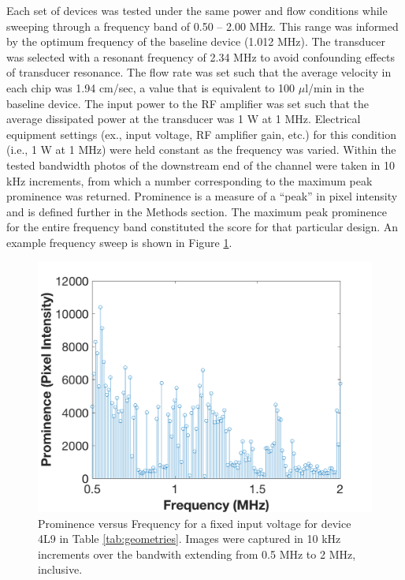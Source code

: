 Each set of devices was tested under the same power and flow conditions while sweeping through a frequency band  of  0.50 -- 2.00 MHz.  This range was informed by the optimum frequency of the baseline device (1.012 MHz).  The transducer was selected with a resonant frequency of 2.34 MHz to avoid confounding effects of transducer resonance. The flow rate was set such that the average velocity in each chip was  1.94 cm/sec, a value that is equivalent to 100 $\mu$l/min in the baseline device. The input power to the RF amplifier was set such that the average dissipated power at the transducer was 1 W at 1 MHz. Electrical equipment settings (ex., input voltage, RF amplifier gain, etc.) for this condition (i.e., 1 W at 1 MHz) were held constant as the frequency was varied. Within the tested bandwidth photos of the downstream end of the channel were taken in 10 kHz increments, from which a number corresponding to the maximum peak prominence was returned.   Prominence is a measure of a ``peak'' in pixel intensity and is defined further in the Methods section. The maximum peak prominence for the entire frequency band constituted the score for that particular design. An example frequency sweep is shown in Figure \ref{fig:freqSweep}.


\begin{figure}[htb]
  \begin{minipage}[t]{0.99\linewidth}\centering
	\includegraphics[width=12cm]{freqSweep}
  \end{minipage}\hfill
	\caption[Prominence versus frequency across swept bandwidth]{Prominence versus Frequency for a fixed input voltage for device 4L9 in Table \ref{tab:geometries}. Images were captured in 10 kHz increments over the bandwith extending from 0.5 MHz to 2 MHz, inclusive.}
	\label{fig:freqSweep}
\end{figure}

